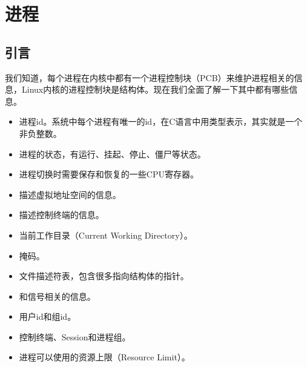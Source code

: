 

\chapter{进程}
%





\section{引言}
%
我们知道，每个进程在内核中都有一个进程控制块（PCB）来维护进程相关的信息，Linux内核的进程控制块是结构体。现在我们全面了解一下其中都有哪些信息。


\begin{itemize}

\item 进程id。系统中每个进程有唯一的id，在C语言中用类型表示，其实就是一个非负整数。

\item 进程的状态，有运行、挂起、停止、僵尸等状态。

\item 进程切换时需要保存和恢复的一些CPU寄存器。

\item 描述虚拟地址空间的信息。

\item 描述控制终端的信息。

\item 当前工作目录（Current Working Directory）。

\item {}掩码。

\item 文件描述符表，包含很多指向结构体的指针。

\item 和信号相关的信息。

\item 用户id和组id。

\item 控制终端、Session和进程组。

\item 进程可以使用的资源上限（Resource Limit）。
\end{itemize}


